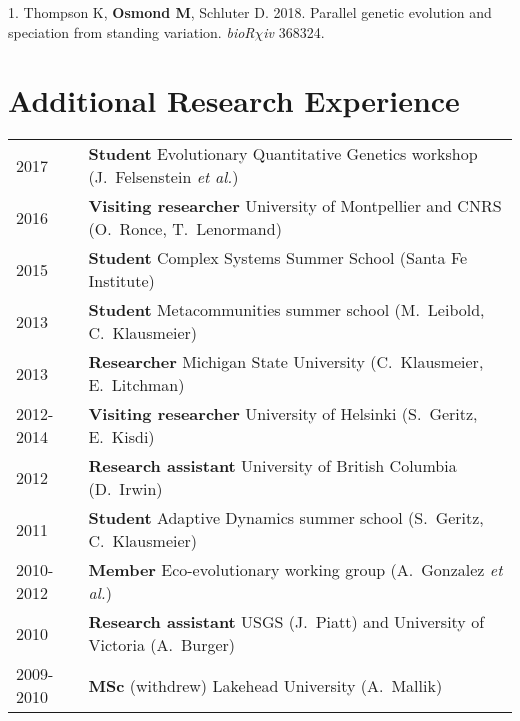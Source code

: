 \documentclass[12pt]{article}
\begin{document}
\noindent\hspace{.1cm}1. Thompson K, \textbf{Osmond M}, Schluter D. 2018. Parallel genetic evolution and speciation from standing variation. \textit{bioR$\chi$iv} 368324. %



\section*{Additional Research Experience}

\begin{tabular}{ll}
2017 & \textbf{Student} Evolutionary Quantitative Genetics workshop (J.\ Felsenstein \textit{et al.})\\
2016 & \textbf{Visiting researcher} University of Montpellier and CNRS (O.\ Ronce, T.\ Lenormand)\\ 
2015 & \textbf{Student} Complex Systems Summer School (Santa Fe Institute)\\
2013 &  \textbf{Student} Metacommunities summer school  (M.\ Leibold, C.\ Klausmeier)\\
2013 &  \textbf{Researcher} Michigan State University (C.\ Klausmeier, E.\ Litchman)\\
2012-2014 &  \textbf{Visiting researcher} University of Helsinki (S.\ Geritz, E.\ Kisdi)\\ 
2012 &  \textbf{Research assistant} University of British Columbia (D.\ Irwin)\\
2011 &  \textbf{Student} Adaptive Dynamics summer school  (S.\ Geritz, C.\ Klausmeier)\\
2010-2012 &  \textbf{Member} Eco-evolutionary working group (A.\ Gonzalez \textit{et al.})\\
2010 & \textbf{Research assistant} USGS (J.\ Piatt) and University of Victoria (A.\ Burger) \\
2009-2010 & \textbf{MSc} (withdrew) Lakehead University (A.\ Mallik) \\
\end{tabular}
\end{document}
